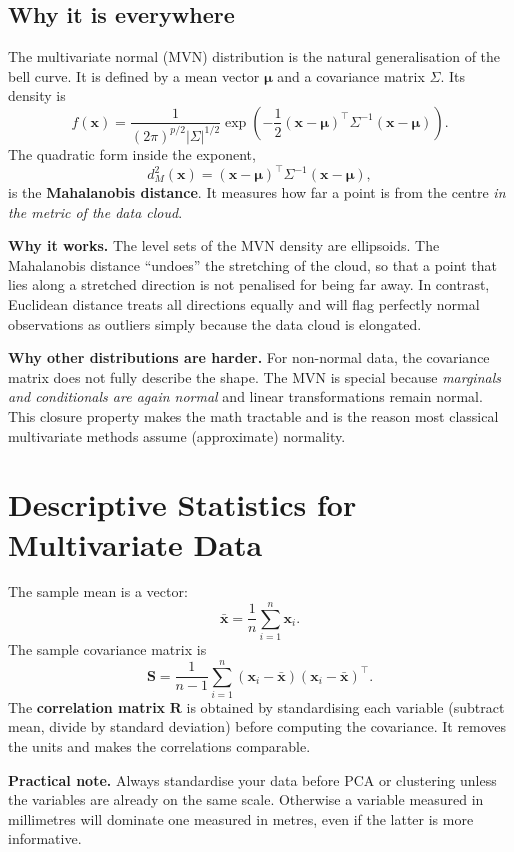 \documentclass[11pt,a4paper]{article}
\newcommand{\vect}[1]{\mathbf{#1}}
\newcommand{\mat}[1]{\mathbf{#1}}
\begin{document}
\subsection{Why it is everywhere}
The multivariate normal (MVN) distribution is the natural
generalisation of the bell curve.  It is defined by a mean vector
$\boldsymbol{\mu}$ and a covariance matrix $\Sigma$.  Its density is
\[
f(\vect{x}) = \frac{1}{(2\pi)^{p/2}|\Sigma|^{1/2}}
\exp\!\left(-\frac12(\vect{x}-\boldsymbol{\mu})^\top
\Sigma^{-1}(\vect{x}-\boldsymbol{\mu})\right).
\]
The quadratic form inside the exponent,
\[
d_M^2(\vect{x}) = (\vect{x}-\boldsymbol{\mu})^\top
\Sigma^{-1}(\vect{x}-\boldsymbol{\mu}),
\]
is the \textbf{Mahalanobis distance}.  It measures how far a point is
from the centre \emph{in the metric of the data cloud}.

\textbf{Why it works.}  The level sets of the MVN density are
ellipsoids.  The Mahalanobis distance ``undoes'' the stretching of the
cloud, so that a point that lies along a stretched direction is not
penalised for being far away.  In contrast, Euclidean distance treats
all directions equally and will flag perfectly normal observations as
outliers simply because the data cloud is elongated.

\textbf{Why other distributions are harder.}  For non-normal data, the
covariance matrix does not fully describe the shape.  The MVN is
special because \emph{marginals and conditionals are again normal} and
linear transformations remain normal.  This closure property makes the
math tractable and is the reason most classical multivariate methods
assume (approximate) normality.

\section{Descriptive Statistics for Multivariate Data}

The sample mean is a vector:
\[
\bar{\vect{x}} = \frac1n \sum_{i=1}^n \vect{x}_i .
\]
The sample covariance matrix is
\[
\mat{S} = \frac{1}{n-1}\sum_{i=1}^n
(\vect{x}_i-\bar{\vect{x}})(\vect{x}_i-\bar{\vect{x}})^\top .
\]
The \textbf{correlation matrix} $\mat{R}$ is obtained by standardising
each variable (subtract mean, divide by standard deviation) before
computing the covariance.  It removes the units and makes the
correlations comparable.

\textbf{Practical note.}  Always standardise your data before PCA or
clustering unless the variables are already on the same scale.
Otherwise a variable measured in millimetres will dominate one
measured in metres, even if the latter is more informative.
\end{document}
